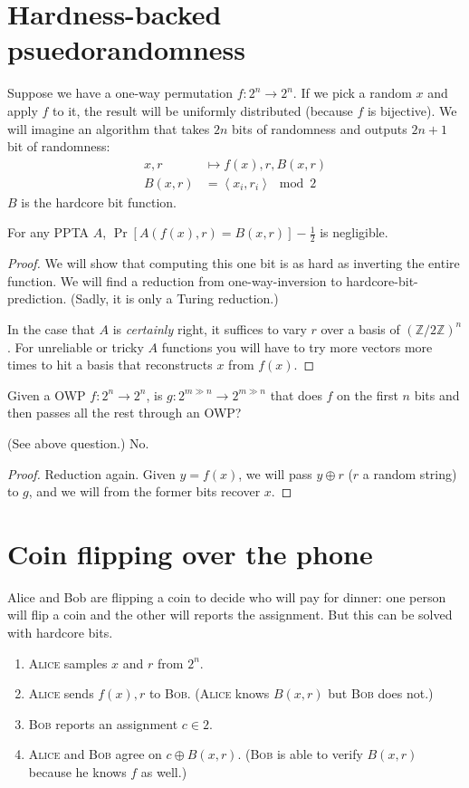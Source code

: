 \section{Hardness-backed psuedorandomness}
Suppose we have a one-way permutation \(f: 2^n \to 2^n\).
If we pick a random \(x\) and apply \(f\) to it, the result will be uniformly distributed (because \(f\) is bijective).
We will imagine an algorithm that takes \(2n\) bits of randomness and outputs \(2n+1\) bit of randomness:
\begin{align}
x, r &\mapsto f(x), r, B(x,r) \\
B(x, r) &= \left\langle x_i, r_i\right\rangle \mod 2
\end{align}
\(B\) is the hardcore bit function.
\begin{theorem}
	For any PPTA \(A\), \(\Pr\left[ A\left(f(x), r\right) = B(x, r)\right] - \frac{1}{2}\) is negligible.
\end{theorem}
\begin{proof}
	We will show that computing this one bit is as hard as inverting the entire function.
	We will find a reduction from one-way-inversion to hardcore-bit-prediction. (Sadly, it is only a Turing reduction.)
	
	In the case that \(A\) is \emph{certainly} right, it suffices to vary \(r\) over a basis of \(\left(\mathbb{Z}/2\mathbb{Z}\right)^n\).
	For unreliable or tricky \(A\) functions you will have to try more vectors more times to hit a basis that reconstructs \(x\) from \(f(x)\).
\end{proof}

Given a OWP \(f: 2^n \to 2^n\), is \(g: 2^{m \gg n} \to 2^{m \gg n}\) that does \(f\) on the first \(n\) bits and then passes all the rest through an OWP?
\begin{theorem}
	(See above question.) No.
\end{theorem}
\begin{proof}
	Reduction again. Given \(y = f(x)\), we will pass \(y\oplus r\) (\(r\) a random string) to \(g\), and we will from the former bits recover \(x\).
\end{proof}

\section{Coin flipping over the phone}
Alice and Bob are flipping a coin to decide who will pay for dinner: one person will flip a coin and the other will reports the assignment.
But this can be solved with hardcore bits.

\begin{enumerate}
	\item \textsc{Alice} samples \(x\) and \(r\) from \(2^n\).
	\item \textsc{Alice} sends \(f(x), r\) to \textsc{Bob}. (\textsc{Alice} knows \(B(x,r)\) but \textsc{Bob} does not.)
	\item \textsc{Bob} reports an assignment \(c\in 2\).
	\item \textsc{Alice} and \textsc{Bob} agree on \(c\oplus B(x, r)\). (\textsc{Bob} is able to verify \(B(x,r)\) because he knows \(f\) as well.)
\end{enumerate}